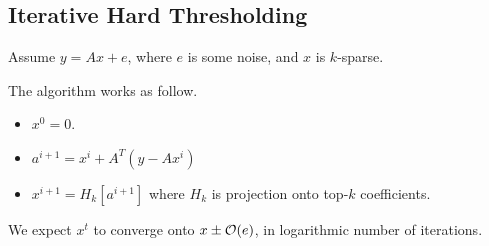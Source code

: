 \documentclass[11pt]{article}
\begin{document}
\subsection{Iterative Hard Thresholding \cite{4960344}}

Assume $y = Ax+e$, where $e$ is some noise, and $x$ is $k$-sparse.

The algorithm works as follow. 
\begin{itemize}
\item $x^0 = 0$.
\item $a^{i+1} = x^i + A^T(y - Ax^i)$
\item $x^{i+1} = H_k[a^{i+1}]$ where $H_k$ is projection onto top-$k$ coefficients.
\end{itemize}

We expect $x^t$ to converge onto $x \pm \mathcal{O}(e)$, in logarithmic number of iterations.
\end{document}

